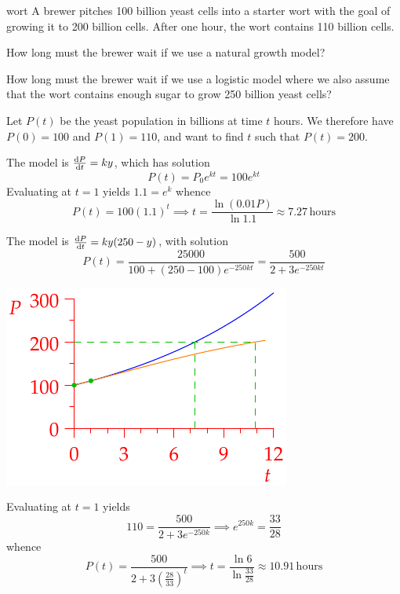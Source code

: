 \begin{example}{}{wort}
A brewer pitches 100 billion yeast cells into a starter wort with the goal of growing it to 200 billion cells. After one hour, the wort contains 110 billion cells.
\begin{enumeratea}
  \item How long must the brewer wait if we use a natural growth model?
  \item How long must the brewer wait if we use a logistic model where we also assume that the wort contains enough sugar to grow 250 billion yeast cells?
\end{enumeratea}

Let $P(t)$ be the yeast population in billions at time $t$ hours. We therefore have $P(0)=100$ and $P(1)=110$, and want to find $t$ such that $P(t)=200$.
\begin{enumeratea}
  \begin{minipage}[t]{0.6\linewidth}\vspace{0pt}
  \item The model is $\diff[P]{t}=ky$, which has solution
  \[P(t)=P_0e^{kt}=100e^{kt}\]
  Evaluating at $t=1$ yields $1.1=e^k$ whence
  \[P(t)=100(1.1)^t\implies t=\frac{\ln(0.01 P)}{\ln 1.1}\approx 7.27\,\text{hours}\]
	\item The model is $\diff[P]{t}=ky(250-y)$, with solution
	\[P(t)=\frac{25000}{100+(250-100)e^{-250kt}} =\frac{500}{2+3e^{-250kt}}\]
  \end{minipage}\begin{minipage}[t]{0.4\linewidth}\vspace{0pt}
  \flushright\includegraphics{wort}
  \end{minipage}\smallbreak
  
	Evaluating at $t=1$ yields
	\[110=\frac{500}{2+3e^{-250k}} \implies e^{250k}=\frac{33}{28}\]
	whence
	\[P(t)=\frac{500}{2+3\left(\frac{28}{33}
	\right)^t} \implies t=\frac{\ln 6}{\ln\frac{33}{28}} \approx 10.91\,\text{hours}\]
  \end{enumeratea}
\end{example}


